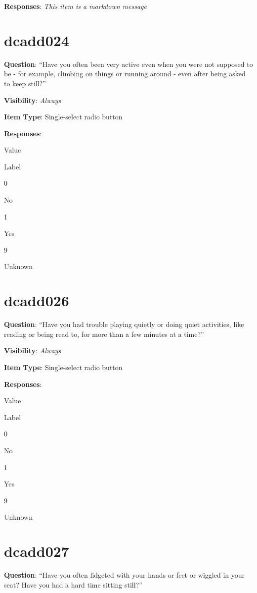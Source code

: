 \documentclass[]{book}
\begin{document}
\textbf{Responses}: \emph{This item is a markdown message}

\hypertarget{dcadd024}{%
\section{dcadd024}\label{dcadd024}}

\textbf{Question}: ``Have you often been very active even when you were not supposed to be - for example, climbing on things or running around - even after being asked to keep still?''

\textbf{Visibility}: \emph{Always}

\textbf{Item Type}: Single-select radio button

\textbf{Responses}:

Value

Label

0

No

1

Yes

9

Unknown

\hypertarget{dcadd026}{%
\section{dcadd026}\label{dcadd026}}

\textbf{Question}: ``Have you had trouble playing quietly or doing quiet activities, like reading or being read to, for more than a few minutes at a time?''

\textbf{Visibility}: \emph{Always}

\textbf{Item Type}: Single-select radio button

\textbf{Responses}:

Value

Label

0

No

1

Yes

9

Unknown

\hypertarget{dcadd027}{%
\section{dcadd027}\label{dcadd027}}

\textbf{Question}: ``Have you often fidgeted with your hands or feet or wiggled in your seat? Have you had a hard time sitting still?''
\end{document}
